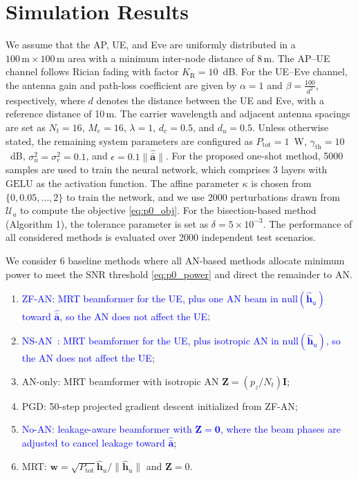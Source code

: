 \documentclass[journal]{IEEEtran}
\begin{document}
\section{Simulation Results}
We assume that the AP, UE, and Eve are uniformly distributed in a \(100\,\text{m} \times 100\,\text{m}\) area with a minimum inter-node distance of 8\,m. The AP–UE channel follows Rician fading with factor $K_{\mathrm{R}}=10$~dB. For the UE–Eve channel, the antenna gain and path-loss coefficient are given by \(\alpha = 1\) and \(\beta = \frac{100}{d^2}\), respectively, where \(d\) denotes the distance between the UE and Eve, with a reference distance of 10\,m. The carrier wavelength and adjacent antenna spacings are set as $N_t=16$, $M_e=16$, \(\lambda = 1\), \(d_e = 0.5\), and \(d_u = 0.5\). Unless otherwise stated, the remaining system parameters are configured as \(P_{\mathrm{tot}} = 1\)~W, $\gamma_{\mathrm{th}}=10$~dB, \(\sigma_u^2 = \sigma_e^2 = 0.1\), and \(\epsilon = 0.1\|\hat{\bar{\mathbf{a}}}\|\). For the proposed one-shot method, 5000 samples are used to train the neural network, which comprises \(3\) layers with \(\mathrm{GELU}\) as the activation function. The affine parameter $\kappa$ is chosen from $\{0,0.05,\ldots,2\}$ to train the network, and we use 2000 perturbations drawn from $\mathcal{U}_a$ to compute the objective \eqref{eq:p0_obj}. For the bisection-based method (Algorithm 1), the tolerance parameter is set as $\delta=5\times 10^{-3}$. The performance of all considered methods is evaluated over 2000 independent test scenarios.

We consider 6 baseline methods where all AN-based methods allocate minimum power to meet the SNR threshold \eqref{eq:p0_power} and direct the remainder to AN.
\begin{enumerate}
    \item \textcolor{blue}{ZF-AN: MRT beamformer for the UE, plus one AN beam in $\mathrm{null}(\hat{\mathbf{h}}_u)$ toward $\hat{\bar{\mathbf{a}}}$, so the AN does not affect the UE};
    \item \textcolor{blue}{NS-AN~\cite{goel2008guaranteeing}: MRT beamformer for the UE, plus isotropic AN in $\mathrm{null}(\hat{\mathbf{h}}_u)$, so the AN does not affect the UE};
    \item AN-only: MRT beamformer with isotropic AN $\mathbf{Z}\!=\!(p_z/N_t)\mathbf{I}$;
    \item PGD: 50-step projected gradient descent initialized from ZF-AN;
    \item \textcolor{blue}{No-AN: leakage-aware beamformer with $\mathbf{Z}\!=\!\mathbf{0}$, where the beam phases are adjusted to cancel leakage toward $\hat{\bar{\mathbf{a}}}$};
    \item MRT: $\mathbf{w}\!=\!\sqrt{P_{\mathrm{tot}}}\hat{\mathbf{h}}_u/\|\hat{\mathbf{h}}_u\|$ and $\mathbf{Z}=0$.
\end{enumerate}
\end{document}
